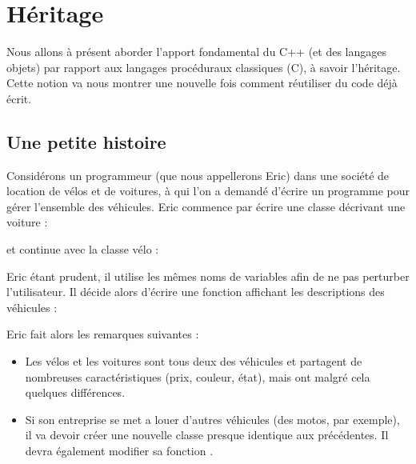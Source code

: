 \chapter{H\'eritage}



Nous allons \`a pr\'esent aborder l'apport fondamental du C++ (et des langages
objets) par rapport aux langages proc\'eduraux classiques (C), \`a savoir
l'h\'eritage. Cette notion va nous montrer une nouvelle fois comment r\'eutiliser du code d\'ej\`a \'ecrit.

\section{Une petite histoire}

Consid\'erons un programmeur (que nous appellerons Eric) dans une soci\'et\'e
de location de v\'elos et de voitures, \`a qui l'on a demand\'e d'\'ecrire un
programme pour g\'erer l'ensemble des v\'ehicules. Eric commence par \'ecrire
une classe d\'ecrivant une voiture :


et continue avec la classe v\'elo :


Eric \'etant prudent, il utilise les m\^emes noms de variables afin
de ne pas perturber l'utilisateur. Il d\'ecide alors d'\'ecrire une fonction
affichant les descriptions des v\'ehicules :



%

Eric fait alors les remarques suivantes :
\begin{itemize}

	\item Les v\'elos et les voitures sont tous deux des v\'ehicules et
		partagent de nombreuses caract\'eristiques (prix, couleur,
		\'etat), mais ont malgr\'e cela quelques diff\'erences.

	\item Si son entreprise se met a louer d'autres v\'ehicules (des motos,
		par exemple), il va devoir cr\'eer une nouvelle classe presque
		identique aux pr\'ec\'edentes. Il devra \'egalement modifier sa
		fonction .

\end{itemize}


